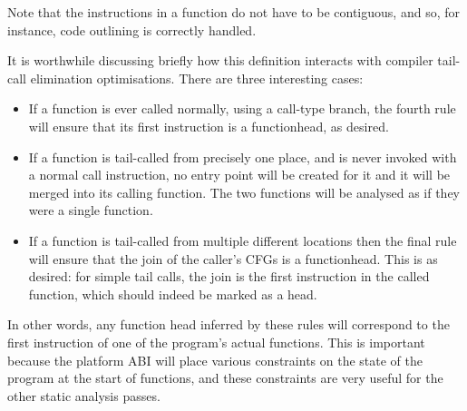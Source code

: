 Note that the instructions in a function do not have to be contiguous,
and so, for instance, code outlining is correctly
handled.

It is worthwhile discussing briefly how this definition interacts with
compiler tail-call elimination optimisations.  There are three
interesting cases:

\begin{itemize}
\item
  If a function is ever called normally, using a call-type branch, the
  fourth rule will ensure that its first instruction is a
  \gls{functionhead}, as desired.
\item
  If a function is tail-called from precisely one place, and is never
  invoked with a normal call instruction, no entry point will be
  created for it and it will be merged into its calling function.  The
  two functions will be analysed as if they were a single function.
\item
  If a function is tail-called from multiple different locations then
  the final rule will ensure that the join of the caller's CFGs is a
  \gls{functionhead}.  This is as desired: for simple tail calls, the
  join is the first instruction in the called function, which should
  indeed be marked as a head.
\end{itemize}

In other words, any function head inferred by these rules will
correspond to the first instruction of one of the program's actual
functions.  This is important because the platform ABI will place
various constraints on the state of the program at the start of
functions, and these constraints are very useful for the other static
analysis passes.


